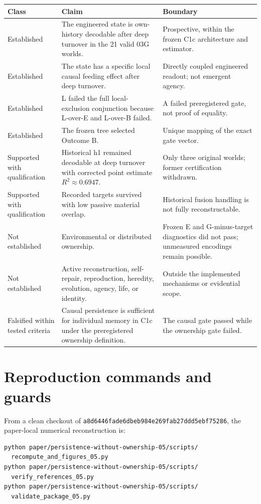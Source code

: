 \documentclass[10pt]{article}
\newcommand{\code}[1]{\texttt{#1}}
\begin{document}
\begin{longtable}{p{}p{}p{}}
\toprule
Class & Claim & Boundary \\
\midrule
\endhead
Established & The engineered state is own-history decodable after deep turnover in the 21 valid 03G worlds. & Prospective, within the frozen C1c architecture and estimator. \\
Established & The state has a specific local causal feeding effect after deep turnover. & Directly coupled engineered readout; not emergent agency. \\
Established & L failed the full local-exclusion conjunction because L-over-E and L-over-B failed. & A failed preregistered gate, not proof of equality. \\
Established & The frozen tree selected Outcome B. & Unique mapping of the exact gate vector. \\
Supported with qualification & Historical h1 remained decodable at deep turnover with corrected point estimate $R^2\approx0.6947$. & Only three original worlds; former certification withdrawn. \\
Supported with qualification & Recorded targets survived with low passive material overlap. & Historical fusion handling is not fully reconstructable. \\
Not established & Environmental or distributed ownership. & Frozen E and G-minus-target diagnostics did not pass; unmeasured encodings remain possible. \\
Not established & Active reconstruction, self-repair, reproduction, heredity, evolution, agency, life, or identity. & Outside the implemented mechanisms or evidential scope. \\
Falsified within tested criteria & Causal persistence is sufficient for individual memory in C1c under the preregistered ownership definition. & The causal gate passed while the ownership gate failed. \\
\bottomrule
\end{longtable}

\section{Reproduction commands and guards}

From a clean checkout of \code{a8d6446fade6dbeb984e269fab27ddd5ebf75286}, the paper-local numerical reconstruction is:

\begin{verbatim}
python paper/persistence-without-ownership-05/scripts/
  recompute_and_figures_05.py
python paper/persistence-without-ownership-05/scripts/
  verify_references_05.py
python paper/persistence-without-ownership-05/scripts/
  validate_package_05.py
\end{verbatim}
\end{document}
